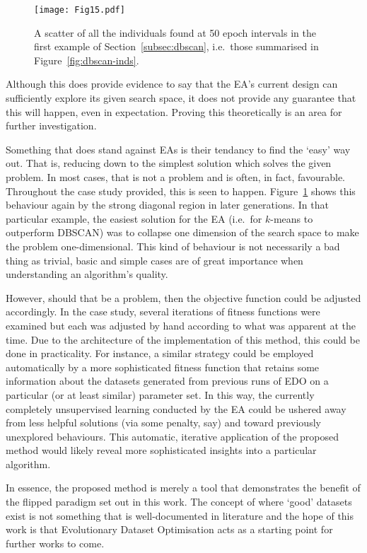 \documentclass[11pt]{article}
\newlength{\imgwidth}
\begin{document}
\begin{figure}[htbp]
    \texttt{[image: Fig15.pdf]}
    \caption{%
        A scatter of all the individuals found at 50 epoch intervals in the
        first example of Section~\ref{subsec:dbscan}, i.e.\ those summarised in
        Figure~\ref{fig:dbscan-inds}.
    }\label{fig:coverage}
\end{figure}

Although this does provide evidence to say that the EA's current design can
sufficiently explore its given search space, it does not provide any guarantee
that this will happen, even in expectation. Proving this theoretically is an
area for further investigation.

Something that does stand against EAs is their tendancy to find the `easy' way
out. That is, reducing down to the simplest solution which solves the given
problem. In most cases, that is not a problem and is often, in fact, favourable.
Throughout the case study provided, this is seen to happen.
Figure~\ref{fig:coverage} shows this behaviour again by the strong diagonal
region in later generations. In that particular example, the easiest solution
for the EA (i.e.\ for \(k\)-means to outperform DBSCAN) was to collapse one
dimension of the search space to make the problem one-dimensional. This kind of
behaviour is not necessarily a bad thing as trivial, basic and simple cases are
of great importance when understanding an algorithm's quality.

However, should that be a problem, then the objective function could be adjusted
accordingly. In the case study, several iterations of fitness functions were
examined but each was adjusted by hand according to what was apparent at the
time. Due to the architecture of the implementation of this method, this could
be done in practicality. For instance, a similar strategy could be employed
automatically by a more sophisticated fitness function that retains some
information about the datasets generated from previous runs of EDO on a
particular (or at least similar) parameter set. In this way, the currently
completely unsupervised learning conducted by the EA could be ushered away from
less helpful solutions (via some penalty, say) and toward previously unexplored
behaviours. This automatic, iterative application of the proposed method would
likely reveal more sophisticated insights into a particular algorithm.

In essence, the proposed method is merely a tool that demonstrates the benefit
of the flipped paradigm set out in this work. The concept of where `good'
datasets exist is not something that is well-documented in literature and the
hope of this work is that Evolutionary Dataset Optimisation acts as a starting
point for further works to come.
\end{document}
